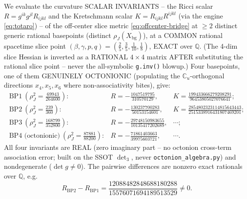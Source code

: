 We evaluate the curvature SCALAR INVARIANTS -- the Ricci scalar
$R = g^{ik}g^{jl}R_{ijkl}$ and the Kretschmann scalar $K = R_{ijkl}R^{ijkl}$ (via
the engine \eqref{eq:totaro}) -- of the off-center slice metric
\eqref{eq:offcenter-bridge} at $\ge 2$ distinct generic rational basepoints
(distinct $\rho_J(X_{\mathrm{bg}})$), at a COMMON rational spacetime slice point
$(\beta,\gamma,p,q)=(\tfrac25,\tfrac35,\tfrac1{10},\tfrac18)$, EXACT over
$\mathbb{Q}$. (The 4-dim slice Hessian is inverted as a RATIONAL $4\times4$ matrix
AFTER substituting the rational slice point -- never the all-symbolic
\texttt{g.inv()} blowup.) Four basepoints, one of them GENUINELY OCTONIONIC
(populating the $\mathbb{C}_u$-orthogonal directions $x_4,x_5,x_6$ where
non-associativity bites), give:
\begin{equation}
  \begin{array}{lll}
    \text{BP1}\ (\rho_J^2 = \tfrac{69943}{264600}): & R = -\tfrac{1047519795}{310570129}, &
       K = \tfrac{199433666279208291}{96453805027076641};\\[4pt]
    \text{BP2}\ (\rho_J^2 = \tfrac{239}{360}): & R = -\tfrac{130237700283}{50153154601}, &
       K = \tfrac{2854802323114815643443}{2515338916431807469201};\\[4pt]
    \text{BP3}\ (\rho_J^2 = \tfrac{168799}{352800}): & R = -\tfrac{29748150983655}{10135417202689}, & \cdots;\\[4pt]
    \text{BP4 (octonionic)}\ (\rho_J^2 = \tfrac{87881}{88200}): & R = -\tfrac{71861403663}{39975603721}, & \cdots.
  \end{array}
  \label{eq:RK-table}
\end{equation}
All four invariants are REAL (zero imaginary part -- no octonion cross-term
association error; built on the SSOT $\det_3$, never \texttt{octonion\_algebra.py})
and nondegenerate ($\det g \neq 0$). The pairwise differences are nonzero exact
rationals over $\mathbb{Q}$, e.g.
\begin{equation}
  R_{\text{BP2}} - R_{\text{BP1}}
  = \frac{12088482848688180288}{15576071694189513529} \neq 0.
  \label{eq:diff}
\end{equation}

